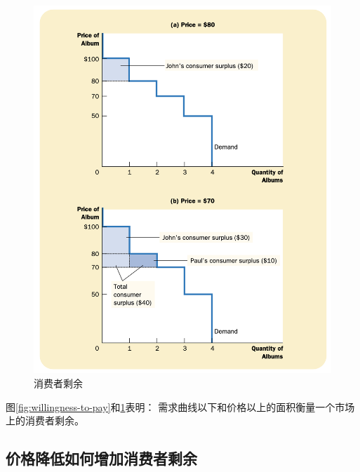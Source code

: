 \begin{figure}[!ht]
  \centering
  \includegraphics[width=\textwidth]{pics/consumer-surplus}
  \caption{消费者剩余}
  \label{fig:consumer-surplus}
\end{figure}

图\ref{fig:willingness-to-pay}和\ref{fig:consumer-surplus}表明：
需求曲线以下和价格以上的面积衡量一个市场上的消费者剩余。


\subsection{价格降低如何增加消费者剩余}

